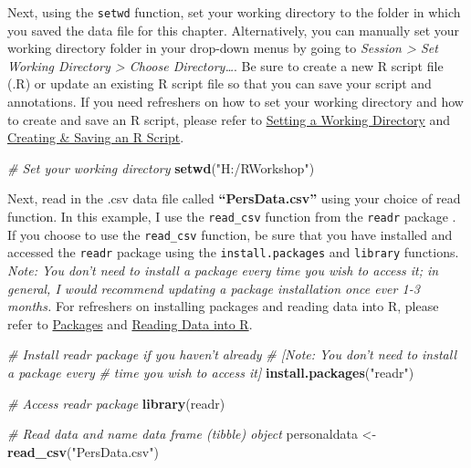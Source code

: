 \documentclass[]{book}
\newenvironment{Shaded}{\begin{snugshade}}{\end{snugshade}}
\newcommand{\KeywordTok}[1]{\textcolor[rgb]{0.13,0.29,0.53}{\textbf{#1}}}
\newcommand{\StringTok}[1]{\textcolor[rgb]{0.31,0.60,0.02}{#1}}
\newcommand{\CommentTok}[1]{\textcolor[rgb]{0.56,0.35,0.01}{\textit{#1}}}
\newcommand{\NormalTok}[1]{#1}
\begin{document}
Next, using the \texttt{setwd} function, set your working directory to
the folder in which you saved the data file for this chapter.
Alternatively, you can manually set your working directory folder in
your drop-down menus by going to \emph{Session \textgreater{} Set
Working Directory \textgreater{} Choose Directory\ldots{}}. Be sure to
create a new R script file (.R) or update an existing R script file so
that you can save your script and annotations. If you need refreshers on
how to set your working directory and how to create and save an R
script, please refer to \protect\hyperlink{setwd}{Setting a Working
Directory} and \protect\hyperlink{createRscript}{Creating \& Saving an R
Script}.

\begin{Shaded}
\begin{Highlighting}[]
\CommentTok{# Set your working directory}
\KeywordTok{setwd}\NormalTok{(}\StringTok{"H:/RWorkshop"}\NormalTok{)}
\end{Highlighting}
\end{Shaded}

Next, read in the .csv data file called \textbf{``PersData.csv''} using
your choice of read function. In this example, I use the
\texttt{read\_csv} function from the \texttt{readr} package
\citep{R-readr}. If you choose to use the \texttt{read\_csv} function,
be sure that you have installed and accessed the \texttt{readr} package
using the \texttt{install.packages} and \texttt{library} functions.
\emph{Note: You don't need to install a package every time you wish to
access it; in general, I would recommend updating a package installation
once ever 1-3 months.} For refreshers on installing packages and reading
data into R, please refer to \protect\hyperlink{packages}{Packages} and
\protect\hyperlink{read}{Reading Data into R}.

\begin{Shaded}
\begin{Highlighting}[]
\CommentTok{# Install readr package if you haven't already}
\CommentTok{# [Note: You don't need to install a package every }
\CommentTok{# time you wish to access it]}
\KeywordTok{install.packages}\NormalTok{(}\StringTok{"readr"}\NormalTok{)}
\end{Highlighting}
\end{Shaded}

\begin{Shaded}
\begin{Highlighting}[]
\CommentTok{# Access readr package}
\KeywordTok{library}\NormalTok{(readr)}

\CommentTok{# Read data and name data frame (tibble) object}
\NormalTok{personaldata <-}\StringTok{ }\KeywordTok{read_csv}\NormalTok{(}\StringTok{"PersData.csv"}\NormalTok{)}
\end{Highlighting}
\end{Shaded}
\end{document}
